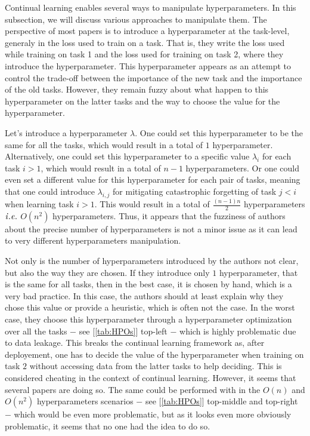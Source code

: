 \documentclass[11pt]{article}
\begin{document}
Continual learning enables several ways to manipulate hyperparameters. In this subsection, we will discuss various approaches to manipulate them. The perspective of most papers is to introduce a hyperparameter at the task-level, generaly in the loss used to train on a task. That is, they write the loss used while training on task 1 and the loss used for training on task 2, where they introduce the hyperparameter. This hyperparameter appears as an attempt to control the trade-off between the importance of the new task and the importance of the old tasks. However, they remain fuzzy about what happen to this hyperparameter on the latter tasks and the way to choose the value for the hyperparameter. 

\vspace{1mm}
\noindent
Let's introduce a hyperparameter $\lambda$. One could set this hyperparameter to be the same for all the tasks, which would result in a total of $1$ hyperparameter. Alternatively, one could set this hyperparameter to a specific value $\lambda_i$ for each task $i>1$, which would result in a total of $n-1$ hyperparameters. Or one could even set a different value for this hyperparameter for each pair of tasks, meaning that one could introduce $\lambda_{i,j}$ for mitigating catastrophic forgetting of task $j<i$ when learning task $i>1$. This would result in a total of $\frac{(n-1)n}{2}$ hyperparameters $\it{i.e.}$ $O(n^2)$ hyperparameters. Thus, it appears that the fuzziness of authors about the precise number of hyperparameters is not a minor issue as it can lead to very different hyperparameters manipulation. 

\vspace{1mm}
\noindent
Not only is the number of hyperparameters introduced by the authors not clear, but also the way they are chosen. If they introduce only $1$ hyperparameter, that is the same for all tasks, then in the best case, it is chosen by hand, which is a very bad practice. In this case, the authors should at least explain why they chose this value or provide a heuristic, which is often not the case. In the worst case, they choose this hyperparameter through a hyperparameter optimization over all the tasks $-$ see [\ref{tab:HPOs}] top-left $-$ which is highly problematic due to data leakage. This breaks the continual learning framework as, after deployement, one has to decide the value of the hyperparameter when training on task $2$ without accessing data from the latter tasks to help deciding. This is considered cheating in the context of continual learning. However, it seems that several papers are doing so. The same could be performed with in the $O(n)$ and $O(n^2)$ hyperparameters scenarios $-$ see [\ref{tab:HPOs}] top-middle and top-right $-$ which would be even more problematic, but as it looks even more obviously problematic, it seems that no one had the idea to do so.
\end{document}
